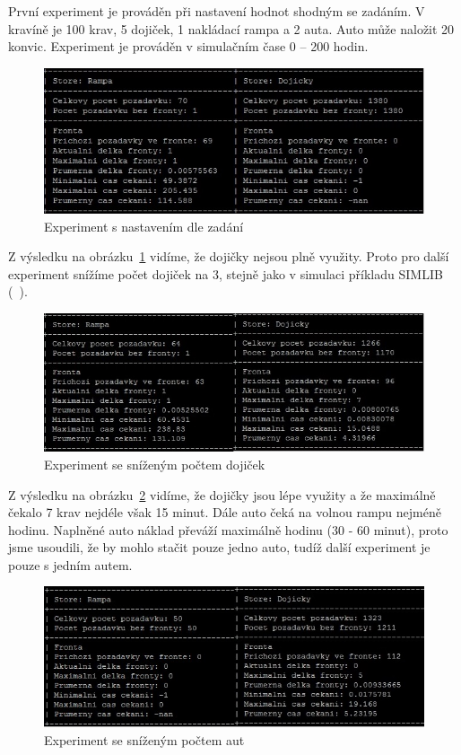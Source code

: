 \documentclass[12pt,a4paper,titlepage,final]{article}
\begin{document}
První experiment je prováděn při nastavení hodnot shodným se zadáním. V kravíně je 100 krav, 5 dojiček, 1 nakládací rampa a 2 auta. Auto může naložit 20 konvic. Experiment je prováděn v simulačním čase 0 -- 200 hodin.

\begin{figure}[!h] 
 	\centering
	 \includegraphics[]{kravy1.jpg}
\caption{Experiment s nastavením dle zadání}
\label{obr1}
\end{figure}

Z výsledku na obrázku~\ref{obr1} vidíme, že dojičky nejsou plně využity. Proto pro další experiment snížíme počet dojiček na 3, stejně jako v simulaci příkladu  SIMLIB (~\cite{priklady}).

\begin{figure}[!h] 
 	\centering
	 \includegraphics[]{kravy2.jpg}
\caption{Experiment se sníženým počtem dojiček}
\label{obr2}
\end{figure}

Z výsledku na obrázku~\ref{obr2} vidíme, že dojičky jsou lépe využity a že maximálně čekalo 7 krav nejdéle však 15 minut. Dále auto čeká na volnou rampu nejméně hodinu. Naplněné auto náklad převáží maximálně hodinu (30 - 60 minut), proto jsme usoudili, že by mohlo stačit pouze jedno auto, tudíž další experiment je pouze s jedním autem.

\begin{figure}[!h] 
 	\centering
	 \includegraphics[]{kravy3.jpg}
\caption{Experiment se sníženým počtem aut}
\label{obr3}
\end{figure}
\end{document}
